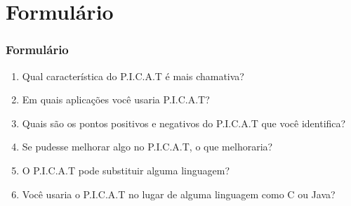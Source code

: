 \documentclass[sans]{beamer}
\begin{document}
\section{Formulário}
\begin{frame}[fragile]
\frametitle{Formulário}

\begin{enumerate}
 \item Qual característica do P.I.C.A.T é mais chamativa?
 \item Em quais aplicações você usaria P.I.C.A.T?
 \item Quais são os pontos positivos e negativos do P.I.C.A.T que você identifica?
 \item Se pudesse melhorar algo no P.I.C.A.T, o que melhoraria?
 \item O P.I.C.A.T pode substituir alguma linguagem?
 \item Você usaria o P.I.C.A.T no lugar de alguma linguagem como C ou Java?
\end{enumerate}
\end{frame}
\end{document}
